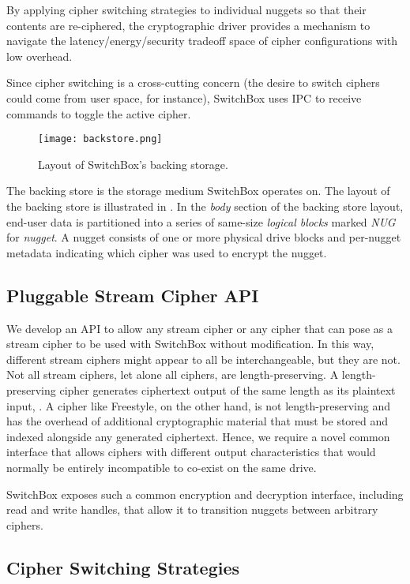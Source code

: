 By applying cipher switching strategies to individual nuggets so that their
contents are re-ciphered, the cryptographic driver provides a mechanism to
navigate the latency/energy/security tradeoff space of cipher configurations
with low overhead.

Since cipher switching is a cross-cutting concern (the desire to switch ciphers
could come from user space, for instance), SwitchBox uses IPC to receive
commands to toggle the active cipher.

\begin{figure}[t]
\centering
\texttt{[image: backstore.png]}
 \caption{Layout of SwitchBox's backing storage.}\label{fig:backstore2}
\end{figure}

The backing store is the storage medium SwitchBox operates on. The layout of the
backing store is illustrated in . In the \textit{body}
section of the backing store layout, end-user data is partitioned into a series
of same-size \emph{logical blocks} marked \textit{NUG} for \emph{nugget}. A
nugget consists of one or more physical drive blocks and per-nugget metadata
indicating which cipher was used to encrypt the nugget.

\subsection{Pluggable Stream Cipher API}

We develop an API to allow any stream cipher or any cipher that can pose as a
stream cipher to be used with SwitchBox without modification. In this way,
different stream ciphers might appear to all be interchangeable, but they are
not. Not all stream ciphers, let alone all ciphers, are length-preserving. A
length-preserving cipher generates ciphertext output of the same length as its
plaintext input, . A cipher like Freestyle, on the other hand, is
not length-preserving and has the overhead of additional cryptographic material
that must be stored and indexed alongside any generated ciphertext. Hence, we
require a novel common interface that allows ciphers with different output
characteristics that would normally be entirely incompatible to co-exist on the
same drive.

SwitchBox exposes such a common encryption and decryption interface, including
read and write handles, that allow it to transition nuggets between arbitrary
ciphers.

\subsection{Cipher Switching Strategies}

